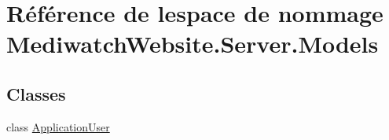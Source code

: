 \hypertarget{namespace_mediwatch_website_1_1_server_1_1_models}{}\section{Référence de l\textquotesingle{}espace de nommage Mediwatch\+Website.\+Server.\+Models}
\label{namespace_mediwatch_website_1_1_server_1_1_models}
\subsection*{Classes}
\begin{DoxyCompactItemize}
\item 
class \hyperlink{class_mediwatch_website_1_1_server_1_1_models_1_1_application_user}{Application\+User}
\end{DoxyCompactItemize}
